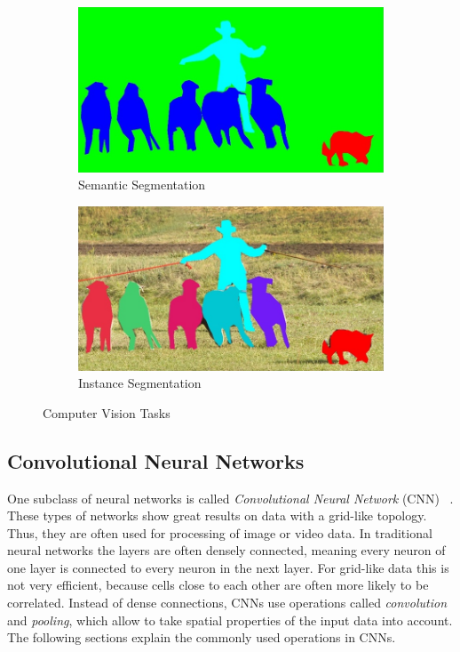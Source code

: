 \begin{figure}[h]
    \hfill
    \begin{subfigure}{\imgWidth}
        \includegraphics[width=\textwidth]{images/vision_task_3}
        \caption{Semantic Segmentation}
        \label{fig:cv_task_semseg}
    \end{subfigure}
    \hfill
    \begin{subfigure}{\imgWidth}
        \includegraphics[width=\textwidth]{images/vision_task_4}
        \caption{Instance Segmentation}
        \label{fig:cv_task_inseg}
    \end{subfigure}
    \hfill

    \caption{Computer Vision Tasks}
    \label{fig:cv_tasks}
\end{figure}

\subsection{Convolutional Neural Networks}
\label{sec:cnn}

One subclass of neural networks is called \emph{Convolutional Neural Network} (CNN) ~\cite[p.~359]{praxiseinstieg_ml17}. These types of networks show great results on data with a grid-like topology. Thus, they are often used for processing of image or video data. In traditional neural networks the layers are often densely connected, meaning every neuron of one layer is connected to every neuron in the next layer. For grid-like data this is not very efficient, because cells close to each other are often more likely to be correlated. Instead of dense connections, CNNs use operations called \emph{convolution} and \emph{pooling}, which allow to take spatial properties of the input data into account. The following sections explain the commonly used operations in CNNs.

